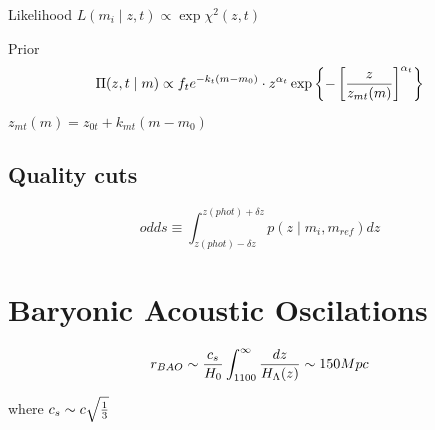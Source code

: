 Likelihood $L(m_i \mid z, t) \propto \exp \chi^2 (z,t)$

Prior
\begin{equation}
\Pi(z, t \mid m) \propto f_t e^{-k_t(m-m_0)} \cdot z^{\alpha_t}\exp \left\lbrace -\left[ {z \over z_{mt}(m)} \right]^{\alpha_t} \right\rbrace
\end{equation}

$z_{mt}(m) = z_{0t} + k_{mt}(m-m_0)$


\subsection{Quality cuts}

\begin{equation}
odds \equiv \int^{z(phot) + \delta z}_{z(phot) - \delta z} p(z \mid m_i, m_{ref})dz
\end{equation}

\section{Baryonic Acoustic Oscilations}
\begin{equation}
r_{BAO} \sim {c_s \over H_0} \int_{1100}^{\infty} {dz \over H_\Lambda(z)} \sim 150 Mpc
\end{equation}

where $c_s \sim c \sqrt{1\over3}$
